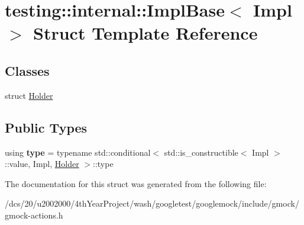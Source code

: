 \hypertarget{structtesting_1_1internal_1_1ImplBase}{}\section{testing\+:\+:internal\+:\+:Impl\+Base$<$ Impl $>$ Struct Template Reference}
\label{structtesting_1_1internal_1_1ImplBase}
\subsection*{Classes}
\begin{DoxyCompactItemize}
\item 
struct \mbox{\hyperlink{structtesting_1_1internal_1_1ImplBase_1_1Holder}{Holder}}
\end{DoxyCompactItemize}
\subsection*{Public Types}
\begin{DoxyCompactItemize}
\item 
\mbox{\label{structtesting_1_1internal_1_1ImplBase_a7c9f35d6b67639c1be1d422b58ba53d4}} 
using {\bfseries type} = typename std\+::conditional$<$ std\+::is\+\_\+constructible$<$ Impl $>$\+::value, Impl, \mbox{\hyperlink{structtesting_1_1internal_1_1ImplBase_1_1Holder}{Holder}} $>$\+::type
\end{DoxyCompactItemize}


The documentation for this struct was generated from the following file\+:\begin{DoxyCompactItemize}
\item 
/dcs/20/u2002000/4th\+Year\+Project/wash/googletest/googlemock/include/gmock/gmock-\/actions.\+h\end{DoxyCompactItemize}
